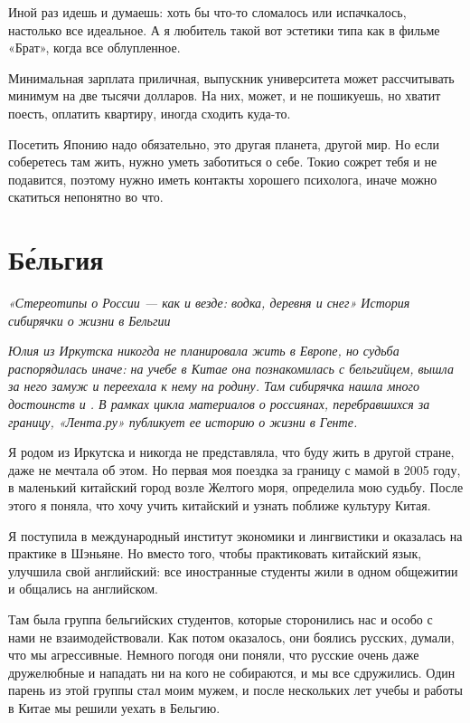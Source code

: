 Иной раз идешь и думаешь: хоть бы что-то сломалось или испачкалось, настолько все идеальное. А я любитель такой вот эстетики типа как в фильме «Брат», когда все облупленное.

Минимальная зарплата приличная, выпускник университета может рассчитывать минимум на две тысячи долларов. На них, может, и не пошикуешь, но хватит поесть, оплатить квартиру, иногда сходить куда-то.

Посетить Японию надо обязательно, это другая планета, другой мир. Но если соберетесь там жить, нужно уметь заботиться о себе. Токио сожрет тебя и не подавится, поэтому нужно иметь контакты хорошего психолога, иначе можно скатиться непонятно во что.

\newpage
\section{Б\'{е}льгия}
\textit{«Стереотипы о России — как и везде: водка, деревня и снег» История сибирячки о жизни в Бельгии}

\textit{Юлия из Иркутска никогда не планировала жить в Европе, но судьба распорядилась иначе: на учебе в Китае она познакомилась с бельгийцем, вышла за него замуж и переехала к нему на родину. Там сибирячка нашла много достоинств и . В рамках цикла материалов о россиянах, перебравшихся за границу, «Лента.ру» публикует ее историю о жизни в Генте.}

Я родом из Иркутска и никогда не представляла, что буду жить в другой стране, даже не мечтала об этом. Но первая моя поездка за границу с мамой в 2005 году, в маленький китайский город возле Желтого моря, определила мою судьбу. После этого я поняла, что хочу учить китайский и узнать поближе культуру Китая.

Я поступила в международный институт экономики и лингвистики и оказалась на практике в Шэньяне. Но вместо того, чтобы практиковать китайский язык, улучшила свой английский: все иностранные студенты жили в одном общежитии и общались на английском.

Там была группа бельгийских студентов, которые сторонились нас и особо с нами не взаимодействовали. Как потом оказалось, они боялись русских, думали, что мы агрессивные. Немного погодя они поняли, что русские очень даже дружелюбные и нападать ни на кого не собираются, и мы все сдружились. Один парень из этой группы стал моим мужем, и после нескольких лет учебы и работы в Китае мы решили уехать в Бельгию.

